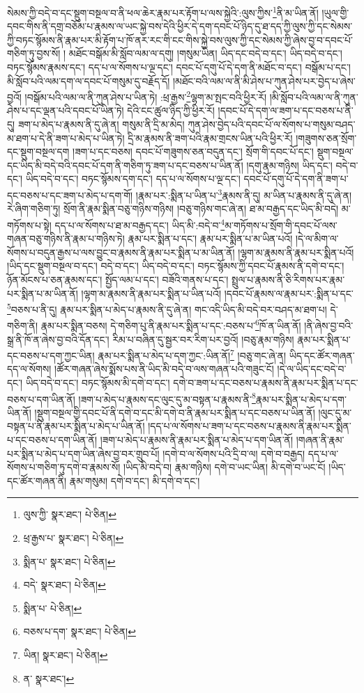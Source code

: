 སེམས་ཀྱི་བདེ་བ་དང་སྡུག་བསྔལ་བ་ནི་ཕལ་ཆེར་རྣམ་པར་རྟོག་པ་ལས་སྐྱེའི་:ལུས་ཀྱིས་\footnote{ལུས་ཀྱི་  སྣར་ཐང་།  པེ་ཅིན། }ནི་མ་ཡིན་ནོ། །ཡུལ་གྱི་དབང་གིས་ནི་དགྲ་བཅོམ་པ་རྣམས་ལ་ཡང་སྐྱེ་བས་དེའི་ཕྱིར་དེ་དག་དབང་པོ་ཉིད་དུ་ཐ་དད་ཀྱི་ལུས་ཀྱི་དང་སེམས་ཀྱི་བཏང་སྙོམས་ནི་རྣམ་པར་མི་རྟོག་པ་ཁོ་ནར་རང་གི་ངང་གིས་སྐྱེ་བས་ལུས་ཀྱི་དང་སེམས་ཀྱི་ཞེས་བྱ་བ་དབང་པོ་གཅིག་ཏུ་བྱས་སོ། །
མཐོང་བསྒོམ་མི་སློབ་ལམ་ལ་དགུ། །གསུམ་ཡིན། ཡིད་དང་བདེ་བ་དང་། ཡིད་བདེ་བ་དང་། བཏང་སྙོམས་རྣམས་དང་། དད་པ་ལ་སོགས་པ་ལྔ་དང་། དབང་པོ་དགུ་པོ་དེ་དག་ནི་མཐོང་བ་དང་། བསྒོམ་པ་དང་། མི་སློབ་པའི་ལམ་དག་ལ་དབང་པོ་གསུམ་དུ་བརྗོད་དོ། །མཐོང་བའི་ལམ་ལ་ནི་མི་ཤེས་པ་ཀུན་ཤེས་པར་བྱེད་པ་ཞེས་བྱའོ། །བསྒོམ་པའི་ལམ་ལ་ནི་ཀུན་ཤེས་པ་ཡིན་ཏེ། :ཕྲ་རྒྱས་\footnote{ཕྲ་རྒྱས་པ་  སྣར་ཐང་།  པེ་ཅིན། }ལྷག་མ་སྤང་བའི་ཕྱིར་རོ། །མི་སློབ་པའི་ལམ་ལ་ནི་ཀུན་ཤེས་པ་དང་ལྡན་པའི་དབང་པོ་ཡིན་ཏེ། དེའི་ངང་ཚུལ་ཉིད་ཀྱི་ཕྱིར་རོ། །དབང་པོ་དེ་དག་ལ་ཟག་པ་དང་བཅས་པ་ནི་དུ། ཟག་པ་མེད་པ་རྣམས་ནི་དུ་ཞེ་ན། གསུམ་ནི་དྲི་མ་མེད། ཀུན་ཤེས་བྱེད་པའི་དབང་པོ་ལ་སོགས་པ་གསུམ་བཤད་མ་ཐག་པ་དེ་ནི་ཟག་པ་མེད་པ་ཡིན་ཏེ། དྲི་མ་རྣམས་ནི་ཟག་པའི་རྣམ་གྲངས་ཡིན་པའི་ཕྱིར་རོ། །གཟུགས་ཅན་སྲོག་དང་སྡུག་བསྔལ་དག །ཟག་པ་དང་བཅས། དབང་པོ་གཟུགས་ཅན་བདུན་དང་། སྲོག་གི་དབང་པོ་དང་། སྡུག་བསྔལ་དང་ཡིད་མི་བདེ་བའི་དབང་པོ་དག་ནི་གཅིག་ཏུ་ཟག་པ་དང་བཅས་པ་ཡིན་ནོ། །དགུ་རྣམ་གཉིས། ཡིད་དང་། བདེ་བ་དང་། ཡིད་བདེ་བ་དང་། བཏང་སྙོམས་དག་དང་། དད་པ་ལ་སོགས་པ་ལྔ་དང་། དབང་པོ་དགུ་པོ་དེ་དག་ནི་ཟག་པ་དང་བཅས་པ་དང་ཟག་པ་མེད་པ་དག་གོ། །རྣམ་པར་:སྨིན་པ་ཡིན་པ་\footnote{སྨིན་པ་  སྣར་ཐང་།  པེ་ཅིན། }རྣམས་ནི་དུ། མ་ཡིན་པ་རྣམས་ནི་དུ་ཞེ་ན། རེ་ཞིག་གཅིག་ཏུ། སྲོག་ནི་རྣམ་སྨིན་བཅུ་གཉིས་གཉིས། །བཅུ་གཉིས་གང་ཞེ་ན། ཐ་མ་བརྒྱད་དང་ཡིད་མི་བདེ། མ་གཏོགས་པ་སྟེ། དད་པ་ལ་སོགས་པ་ཐ་མ་བརྒྱད་དང་། ཡིད་མི་:བདེ་བ་\footnote{བདེ་  སྣར་ཐང་།  པེ་ཅིན། }མ་གཏོགས་པ་སྲོག་གི་དབང་པོ་ལས་གཞན་བཅུ་གཉིས་ནི་རྣམ་པ་གཉིས་ཏེ། རྣམ་པར་སྨིན་པ་དང་། རྣམ་པར་སྨིན་པ་མ་ཡིན་པའོ། །དེ་ལ་མིག་ལ་སོགས་པ་བདུན་རྒྱས་པ་ལས་བྱུང་བ་རྣམས་ནི་རྣམ་པར་སྨིན་པ་མ་ཡིན་ནོ། །ལྷག་མ་རྣམས་ནི་རྣམ་པར་སྨིན་པའོ། །ཡིད་དང་སྡུག་བསྔལ་བ་དང་། བདེ་བ་དང་། ཡིད་བདེ་བ་དང་། བཏང་སྙོམས་ཀྱི་དབང་པོ་རྣམས་ནི་དགེ་བ་དང་། ཉོན་མོངས་པ་ཅན་རྣམས་དང་། སྤྱོད་ལམ་པ་དང་། བཟོའི་གནས་པ་དང་། སྤྲུལ་པ་རྣམས་ནི་ཅི་རིགས་པར་རྣམ་པར་སྨིན་པ་མ་ཡིན་ནོ། །ལྷག་མ་རྣམས་ནི་རྣམ་པར་སྨིན་པ་ཡིན་པའོ། །དབང་པོ་རྣམས་ལ་རྣམ་པར་:སྨིན་པ་དང་\footnote{སྨིན་པ་  པེ་ཅིན། }བཅས་པ་ནི་དུ། རྣམ་པར་སྨིན་པ་མེད་པ་རྣམས་ནི་དུ་ཞེ་ན། གང་འདི་ཡིད་མི་བདེ་བར་བཤད་མ་ཐག་པ། དེ་གཅིག་ནི། རྣམ་པར་སྨིན་བཅས། དེ་གཅིག་པུ་ནི་རྣམ་པར་སྨིན་པ་དང་:བཅས་པ་\footnote{བཅས་པ་དག་  སྣར་ཐང་།  པེ་ཅིན། }ཁོ་ན་ཡིན་ནོ། །ནི་ཞེས་བྱ་བའི་སྒྲ་ནི་ཁོ་ན་ཞེས་བྱ་བའི་དོན་དང་། རིམ་པ་བཞིན་དུ་སྦྱར་བར་རིག་པར་བྱའོ། །བཅུ་རྣམ་གཉིས། རྣམ་པར་སྨིན་པ་དང་བཅས་པ་དག་ཀྱང་ཡིན། རྣམ་པར་སྨིན་པ་མེད་པ་དག་ཀྱང་:ཡིན་ནོ།\footnote{ཡིན།  སྣར་ཐང་།  པེ་ཅིན། } །བཅུ་གང་ཞེ་ན། ཡིད་དང་ཚོར་གཞན་དད་ལ་སོགས། །ཚོར་གཞན་ཞེས་སྨོས་པས་ནི་ཡིད་མི་བདེ་བ་ལས་གཞན་པའི་གཟུང་ངོ། །དེ་ལ་ཡིད་དང་བདེ་བ་དང་། ཡིད་བདེ་བ་དང་། བཏང་སྙོམས་མི་དགེ་བ་དང་། དགེ་བ་ཟག་པ་དང་བཅས་པ་རྣམས་ནི་རྣམ་པར་སྨིན་པ་དང་བཅས་པ་དག་ཡིན་ནོ། །ཟག་པ་མེད་པ་རྣམས་དང་ལུང་དུ་མ་བསྟན་པ་རྣམས་ནི་\footnote{ན་  སྣར་ཐང་། }རྣམ་པར་སྨིན་པ་མེད་པ་དག་ཡིན་ནོ། །སྡུག་བསྔལ་གྱི་དབང་པོ་ནི་དགེ་བ་དང་མི་དགེ་བ་ནི་རྣམ་པར་སྨིན་པ་དང་བཅས་པ་ཡིན་ནོ། །ལུང་དུ་མ་བསྟན་པ་ནི་རྣམ་པར་སྨིན་པ་མེད་པ་ཡིན་ནོ། །དད་པ་ལ་སོགས་པ་ཟག་པ་དང་བཅས་པ་རྣམས་ནི་རྣམ་པར་སྨིན་པ་དང་བཅས་པ་དག་ཡིན་ནོ། །ཟག་པ་མེད་པ་རྣམས་ནི་རྣམ་པར་སྨིན་པ་མེད་པ་དག་ཡིན་ནོ། །གཞན་ནི་རྣམ་པར་སྨིན་པ་མེད་པ་དག་ཡིན་ཞེས་བྱ་བར་གྲུབ་པོ། །དགེ་བ་ལ་སོགས་པའི་དྲི་བ་ལ། དགེ་བ་བརྒྱད། དད་པ་ལ་སོགས་པ་གཅིག་ཏུ་དགེ་བ་རྣམས་སོ། །ཡིད་མི་བདེ་བ། རྣམ་གཉིས། དགེ་བ་ཡང་ཡིན། མི་དགེ་བ་ཡང་ངོ། །ཡིད་དང་ཚོར་གཞན་ནི། རྣམ་གསུམ། དགེ་བ་དང་། མི་དགེ་བ་དང་། 